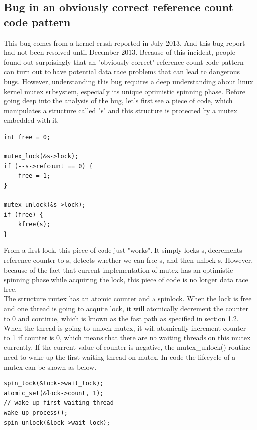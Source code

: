 \documentclass[10pt]{sigplanconf}
\begin{document}
\vspace{50pt}
\subsection{Bug in an obviously correct reference count code pattern}
This bug comes from a kernel crash reported in July 2013. And this bug report had not been resolved until December 2013. Because of this incident, people found out surprisingly that an "obviously correct" reference count code pattern can turn out to have potential data race problems that can lead to dangerous bugs. However, understanding this bug requires a deep understanding about linux kernel mutex subsystem, especially its unique optimistic spinning phase. Before going deep into the analysis of the bug, let's first see a piece of code, which manipulates a structure called "s" and this structure is protected by a mutex embedded with it. 
\lstset{language=C}
\begin{lstlisting}
int free = 0;

mutex_lock(&s->lock);
if (--s->refcount == 0) {
	free = 1;
}

mutex_unlock(&s->lock);
if (free) {
	kfree(s);
}

\end{lstlisting}
\vspace{10pt}
From a first look, this piece of code just "works". It simply locks s, decrements reference counter to s, detects whether we can free s, and then unlock s. However, because of the fact that current implementation of mutex has an optimistic spinning phase while acquiring the lock, this piece of code is no longer data race free. \\
The structure mutex has an atomic counter and a spinlock. When the lock is free and one thread is going to acquire lock, it will atomically decrement the counter to 0 and continue, which is known as the fast path as specified in section 1.2.\\
When the thread is going to unlock mutex, it will atomically increment counter to 1 if counter is 0, which means that there are no waiting threads on this mutex currently. If the current value of counter is negative, the mutex\_unlock() routine need to wake up the first waiting thread on mutex. In code the lifecycle of a mutex can be shown as below.
\vspace{10pt}

\begin{lstlisting}
spin_lock(&lock->wait_lock);
atomic_set(&lock->count, 1);
// wake up first waiting thread
wake_up_process(); 
spin_unlock(&lock->wait_lock);
\end{lstlisting}
\vspace{10pt}
\end{document}
